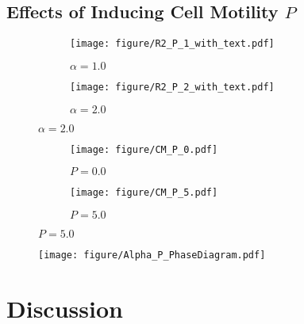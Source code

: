 \documentclass[a4paper,12pt]{article}
\begin{document}
\subsection{Effects of Inducing Cell Motility $P$}

\begin{figure}[h]
\centering
\begin{subfigure}[h]{0.49\textwidth}
\texttt{[image: figure/R2\_P\_1\_with\_text.pdf]}
\caption*{$\alpha = 1.0$}
\end{subfigure}
\begin{subfigure}[h]{0.49\textwidth}
\texttt{[image: figure/R2\_P\_2\_with\_text.pdf]}
\caption*{$\alpha = 2.0$}
\end{subfigure}
\end{figure}

\begin{figure}[h]
\centering
\begin{subfigure}[h]{0.49\textwidth}
\texttt{[image: figure/CM\_P\_0.pdf]}
\caption*{$P = 0.0$}
\end{subfigure}
\begin{subfigure}[h]{0.49\textwidth}
\texttt{[image: figure/CM\_P\_5.pdf]}
\caption*{$P = 5.0$}
\end{subfigure}
\end{figure}
\begin{figure}[h]
\centering
\texttt{[image: figure/Alpha\_P\_PhaseDiagram.pdf]}
\caption{}
\end{figure}
\FloatBarrier


\section{Discussion}
\end{document}
